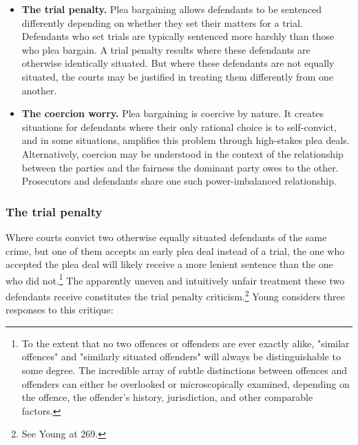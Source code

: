 \begin{itemize}
    \item \textbf{The trial penalty.} Plea bargaining allows defendants to be sentenced differently depending on whether they set their matters for a trial. Defendants who set trials are typically sentenced more harshly than those who plea bargain. A trial penalty results where these defendants are otherwise identically situated. But where these defendants are not equally situated, the courts may be justified in treating them differently from one another. 
    \item \textbf{The coercion worry.} Plea bargaining is coercive by nature. It creates situations for defendants where their only rational choice is to self-convict, and in some situations, amplifies this problem through high-stakes plea deals. Alternatively, coercion may be understood in the context of the relationship between the parties and the fairness the dominant party owes to the other. Prosecutors and defendants share one such power-imbalanced relationship.
\end{itemize}

\subsubsection{The trial penalty}

Where courts convict two otherwise equally situated defendants of the same crime, but one of them accepts an early plea deal instead of a trial, the one who accepted the plea deal will likely receive a more lenient sentence than the one who did not.\footnote{To the extent that no two offences or offenders are ever exactly alike, "similar offences" and "similarly situated offenders" will always be distinguishable to some degree. The incredible array of subtle distinctions between offences and offenders can either be overlooked or microscopically examined, depending on the offence, the offender's history, jurisdiction, and other comparable factors.} The apparently uneven and intuitively unfair treatment these two defendants receive constitutes the trial penalty criticism.\footnote{See Young at 269.} Young considers three responses to this critique:

